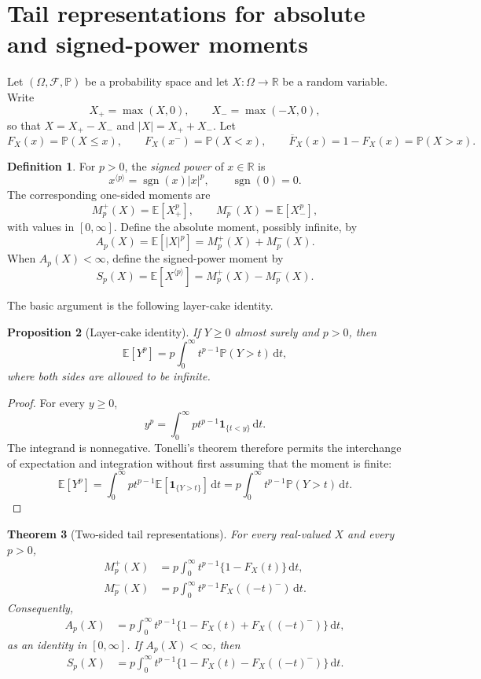 \documentclass[11pt]{article}
\newtheorem{theorem}{Theorem}[section]
\newtheorem{proposition}[theorem]{Proposition}
\theoremstyle{definition}
\newtheorem{definition}[theorem]{Definition}
\theoremstyle{remark}
\newcommand{\E}{\mathbb{E}}
\newcommand{\Pp}{\mathbb{P}}
\newcommand{\R}{\mathbb{R}}
\newcommand{\ind}{\mathbf{1}}
\newcommand{\sgn}{\operatorname{sgn}}
\newcommand{\dd}{\,\mathrm{d}}
\newcommand{\abs}[1]{\left\lvert #1\right\rvert}
\newcommand{\spow}[2]{#1^{\langle #2\rangle}}
\begin{document}
\section{Tail representations for absolute and signed-power moments}
\label{sec:general}

Let $(\Omega,\mathcal F,\Pp)$ be a probability space and let
$X:\Omega\to\R$ be a random variable.  Write
\[
  X_+=\max(X,0),
  \qquad
  X_-=\max(-X,0),
\]
so that $X=X_+-X_-$ and $\abs{X}=X_++X_-$.  Let
\[
  F_X(x)=\Pp(X\leq x),
  \qquad
  F_X(x^-)=\Pp(X<x),
  \qquad
  \overline F_X(x)=1-F_X(x)=\Pp(X>x).
\]

\begin{definition}\label{def:signed-power}
For $p>0$, the \emph{signed power} of $x\in\R$ is
\[
  \spow{x}{p}=\sgn(x)\abs{x}^p,
  \qquad \sgn(0)=0.
\]
The corresponding one-sided moments are
\[
  M_p^+(X)=\E[X_+^p],
  \qquad
  M_p^-(X)=\E[X_-^p],
\]
with values in $[0,\infty]$.  Define the absolute moment, possibly infinite,
by
\[
  A_p(X)=\E[\abs{X}^p]=M_p^+(X)+M_p^-(X).
\]
When $A_p(X)<\infty$, define the signed-power moment by
\[
  S_p(X)=\E[\spow{X}{p}]=M_p^+(X)-M_p^-(X).
\]
\end{definition}

The basic argument is the following layer-cake identity.

\begin{proposition}[Layer-cake identity]\label{prop:layer-cake}
If $Y\geq0$ almost surely and $p>0$, then
\begin{equation}\label{eq:layer-cake}
  \E[Y^p]
  =p\int_0^\infty t^{p-1}\Pp(Y>t)\dd t,
\end{equation}
where both sides are allowed to be infinite.
\end{proposition}

\begin{proof}
For every $y\geq0$,
\[
  y^p=\int_0^\infty p t^{p-1}\ind_{\{t<y\}}\dd t.
\]
The integrand is nonnegative.  Tonelli's theorem therefore permits the
interchange of expectation and integration without first assuming that the
moment is finite:
\[
  \E[Y^p]
  =\int_0^\infty p t^{p-1}\E[\ind_{\{Y>t\}}]\dd t
  =p\int_0^\infty t^{p-1}\Pp(Y>t)\dd t.
\]
\end{proof}

\begin{theorem}[Two-sided tail representations]\label{thm:two-sided}
For every real-valued $X$ and every $p>0$,
\begin{align}
  M_p^+(X)
  &=p\int_0^\infty t^{p-1}\{1-F_X(t)\}\dd t,
  \label{eq:positive-part}\\
  M_p^-(X)
  &=p\int_0^\infty t^{p-1}F_X((-t)^-)\dd t.
  \label{eq:negative-part}
\end{align}
Consequently,
\begin{align}
  A_p(X)
  &=p\int_0^\infty t^{p-1}
    \{1-F_X(t)+F_X((-t)^-)\}\dd t,
  \label{eq:absolute-moment}
\end{align}
as an identity in $[0,\infty]$.  If $A_p(X)<\infty$, then
\begin{align}
  S_p(X)
  &=p\int_0^\infty t^{p-1}
    \{1-F_X(t)-F_X((-t)^-)\}\dd t.
  \label{eq:signed-moment}
\end{align}
\end{theorem}
\end{document}
